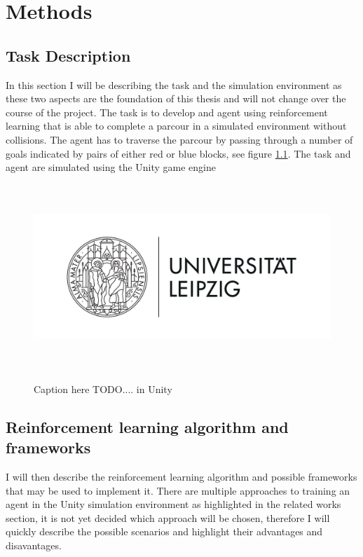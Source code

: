 \chapter{Methods}
\label{cha:Methods}

  

\section{Task Description}

In this section I will be describing the task and the simulation environment as these two aspects are the foundation of this thesis and will not change over the course of the project.
The task is to develop and agent using reinforcement learning that is able to complete a parcour in a simulated environment without collisions. The agent has to traverse the parcour by passing through a number of goals indicated by pairs of either red or blue blocks, see figure \ref*{task}.
The task and agent are simulated using the Unity game engine


\begin{figure}[h!]
     \includegraphics[height=7cm]{Bilder/Uni-L.png}\\[2.5ex]
     \caption{Caption here TODO.... in Unity}
     \label{task}
\end{figure}





\section{Reinforcement learning algorithm and frameworks}

I will then describe the reinforcement learning algorithm and possible frameworks that may be used to implement it. There are multiple approaches to training an agent in the Unity simulation environment as highlighted in the related works section, it is not yet decided which approach will be chosen, therefore I will quickly describe the possible scenarios and highlight their advantages and disavantages.

